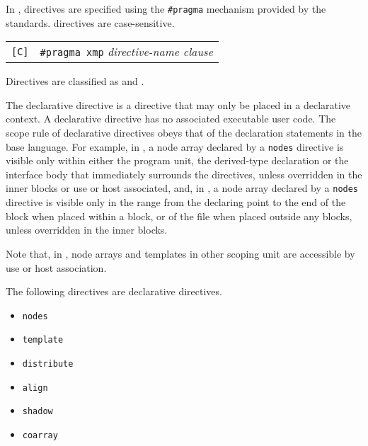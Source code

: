 \vspace{0.5cm}

In {\XMPC}, {\XMP} directives are specified using the \verb|#pragma|
mechanism provided by the {\C} standards. {\XMPC} directives are
case-sensitive.

\vspace{0.5cm}

\begin{tabular}{ll}
\verb![C]! & \verb|#pragma xmp| {\it directive-name clause} \\
\end{tabular}

\vspace{0.5cm}


Directives are classified as {\it {}} and
{\it {}}.

The declarative directive is a directive that may only be
placed in a declarative context. A declarative directive has no
associated executable user code. The scope rule of declarative
directives obeys that of the declaration statements in the base
language.
%
For example, in {\XMPF}, a node array declared by a {\tt nodes}
directive is visible only within either the program unit, the
derived-type declaration or the interface body that immediately
surrounds the directives, unless overridden in the inner blocks or use
or host associated,
%
and, in {\XMPC}, a node array declared by a {\tt nodes} directive is
visible only in the range from the declaring point to the end of 
the block when placed within a block, or of the file when
placed outside any blocks, unless overridden in the inner blocks.

Note that, in {\XMPF}, node arrays and templates in other scoping unit
are accessible by use or host association.

The following directives are declarative directives.

\begin{itemize}
 \item {\tt nodes}
 \item {\tt template}
 \item {\tt distribute}
 \item {\tt align}
 \item {\tt shadow}
 \item {\tt coarray}
\end{itemize}

